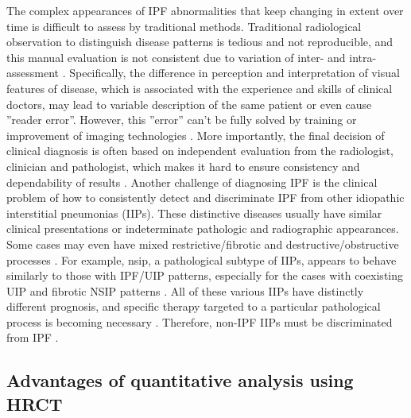 The complex appearances of IPF abnormalities that keep changing in extent over time is difficult to assess by traditional methods. Traditional radiological observation to distinguish disease patterns is tedious and not reproducible, and this manual evaluation is not consistent due to variation of inter- and intra- assessment \citep{flaherty2007idiopathic, watadani2013interobserver}. Specifically, the difference in perception and interpretation of visual features of disease, which is associated with the experience and skills of clinical doctors, may lead to variable description of the same patient or even cause ''reader error''. However, this ''error'' can't be fully solved by training or improvement of imaging technologies \citep{kundel2006history,bartholmai2013quantitative}. More importantly, the final decision of clinical diagnosis is often based on independent evaluation from the radiologist, clinician and pathologist, which makes it hard to ensure consistency and dependability of results  \citep{flaherty2004idiopathic,sverzellati2011method}. Another challenge of diagnosing IPF is the clinical problem of how to consistently detect and discriminate IPF from other idiopathic interstitial pneumonias (IIPs). These distinctive diseases usually have similar clinical presentations or indeterminate pathologic and radiographic appearances. Some cases may even have mixed restrictive/fibrotic and destructive/obstructive processes \citep{bartholmai2013quantitative}. For example, \gls{nsip}, a pathological subtype of IIPs, appears to behave similarly to those with IPF/UIP patterns, especially for the cases with coexisting UIP and fibrotic NSIP patterns \citep{monaghan2004prognostic, flaherty2001histopathologic}. All of these various IIPs have distinctly different prognosis, and specific therapy targeted to a particular pathological process is becoming necessary \citep{lynch2005high}. Therefore, non-IPF IIPs must be discriminated from IPF \citep{bjoraker1998prognostic}. 

\subsection{Advantages of quantitative analysis using HRCT} \label{Advantages}


